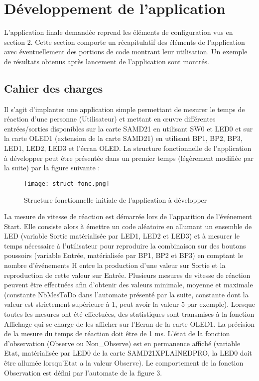 \section{Développement de l'application}

\indent L'application finale demandée reprend les éléments de configuration vus en section 2.
Cette section comporte un récapitulatif des éléments de l'application avec éventuellement des portions de code montrant leur utilisation.
Un exemple de résultats obtenus après lancement de l'application sont montrés.

\subsection{Cahier des charges}

\indent Il s'agit d'implanter une application simple permettant de mesurer le temps de réaction d'une personne (Utilisateur) et mettant en œuvre différentes entrées/sorties disponibles sur la carte SAMD21 en utilisant SW0 et LED0 et sur la carte OLED1 (extension de la carte SAMD21) en utilisant BP1, BP2, BP3, LED1, LED2, LED3 et l'écran OLED.
La structure fonctionnelle de l'application à développer peut être présentée dans un premier temps (légèrement modifiée par la suite) par la figure suivante :

\begin{figure}[h]
    \centering
    \texttt{[image: struct\_fonc.png]}
    \caption{Structure fonctionnelle initiale de l'application à développer}
    \label{fig:struct}
\end{figure}

\indent La mesure de vitesse de réaction est démarrée lors de l'apparition de l'événement Start.
Elle consiste alors à émettre un code aléatoire en allumant un ensemble de LED (variable Sortie matérialisée par LED1, LED2 et LED3) et à mesurer le temps nécessaire à l'utilisateur pour reproduire la combinaison sur des boutons poussoirs (variable Entrée, matérialisée par BP1, BP2 et BP3) en comptant le nombre d'événements H entre la production d'une valeur sur Sortie et la reproduction de cette valeur sur Entrée. 
Plusieurs mesures de vitesse de réaction peuvent être effectuées afin d'obtenir des valeurs minimale, moyenne et maximale (constante NbMesToDo dans l'automate présenté par la suite, constante dont la valeur est strictement supérieure à 1, peut avoir la valeur 5 par exemple).
Lorsque toutes les mesures ont été effectuées, des statistiques sont transmises à la fonction Affichage qui se charge de les afficher sur l'Ecran de la carte OLED1.
La précision de la mesure du temps de réaction doit être de 1 ms.
L'état de la fonction d'observation (Observe ou Non\_Observe) est en permanence affiché (variable Etat, matérialisée par LED0 de la carte SAMD21XPLAINEDPRO, la LED0 doit être allumée lorsqu'Etat a la valeur Observe).
Le comportement de la fonction Observation est défini par l'automate de la figure 3.


